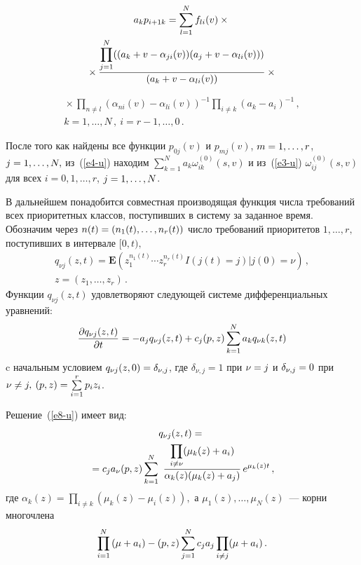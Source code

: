 \begin{multicols}{2}
\noindent
\begin{multline*}
a_kp_{i+1k}=\sum\limits_{l=1}^N f_{li}(v)\times{}\\
{}\times
\displaystyle\frac{\displaystyle \prod\limits_{j=1}^N((a_k+v-\alpha_{ji}(v))(a_j+v-\alpha_{li}(v)))\mathstrut}{\displaystyle (a_k+v-\alpha_{li}(v))\mathstrut}\times{}
\end{multline*}

\noindent
\begin{multline*}
{}\times
\prod\limits_{n\ne l}(\alpha_{ni}(v)-\alpha_{li}(v))^{-1}
\prod\limits_{i\ne k}(a_k-a_i)^{-1}\,,\\
k=1,\ldots,N\,,\ i=r-1,\ldots,0\,.
\end{multline*}

После того как найдены все функции $p_{0j}(v)$ и $p_{mj}(v)$, $m\hm=1,\ldots,r$, 
$j\hm=1,\ldots,N,$ из~(\ref{e4-u}) находим
$\sum\limits_{k=1}^N a_k \omega_{ik}^{(0)}(s,v)$ и из~(\ref{e3-u}) 
$\omega_{ij}^{(0)}(s,v)$ для всех $i=0,1,\ldots,r$, $j\hm=1,\ldots,N$.

В дальнейшем понадобится совместная производящая функция чис\-ла требований всех 
приоритетных классов, поступивших в систему за заданное
время. Обозначим через $n(t)\hm=(n_1(t),\ldots,n_r(t))$ чис\-ло 
требований приоритетов $1,\ldots,r,$ поступивших в интервале $[0,t),$
\begin{multline*}
\!\!q_{\nu j}(z,t)=\mathbf{E}\left(z_1^{n_1(t)}\cdots z_r^{n_r(t)}I(j(t)=j)|j(0)=\nu\right)\,,\\ 
z=(z_1,\ldots,z_r)\,.
\end{multline*}
Функции $q_{\nu j}(z,t)$ удовлетворяют
следующей системе дифференциальных уравнений:
\begin{equation}
\label{e8-u}
\displaystyle\frac{\displaystyle \partial q_{\nu j}(z,t)\mathstrut}{\displaystyle \partial t\mathstrut}=-a_j q_{\nu j}(z,t)+c_j (p,z)
\sum\limits_{k=1}^N a_k q_{\nu k}(z,t)
\end{equation}
c начальным условием $q_{\nu j}(z,0)\hm=\delta_{\nu,j}$, 
где $\delta_{\nu,j}=1$ при $\nu\hm=j$ и $\delta_{\nu,j}\hm=0$ 
при $\nu\hm\ne j,$  $(p,z)\hm=\sum\limits_{i=1}^rp_i z_i$.

Решение~(\ref{e8-u}) имеет вид:
\begin{multline}
\label{e9-u}
q_{\nu j}(z,t)={}\\
{}=c_ja_{\nu}(p,z)\sum\limits_{k=1}^N\ 
\fr{\prod\limits_{i\ne\nu}(\mu_k(z)+a_i)}{\alpha_k(z)(\mu_k(z)+a_j)}\, e^{\mu_k(z)t}\,,
\end{multline}
где $\alpha_k(z)=\prod\limits_{i\ne k}(\mu_k(z)-\mu_i(z)),$ а $\mu_1(z),\ldots,\mu_N(z)$~--- 
корни многочлена
\begin{equation*}
\prod\limits_{i=1}^N\left(\mu\hm+a_i\right)\hm-(p,z) 
\sum\limits_{j=1}^N c_j a_j\prod\limits_{i\ne j}(\mu+a_i)\,.
\end{equation*}


\end{multicols}

